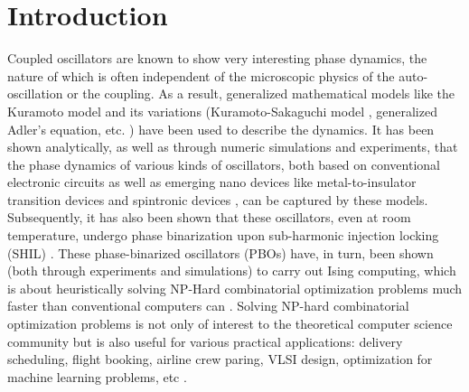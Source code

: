 \documentclass[%
 reprint,
 amsmath,amssymb,
 aps,
]{revtex4-2}
\begin{document}
\maketitle


\section{Introduction}

Coupled oscillators are known to show very interesting phase dynamics, the nature of which is often independent of the microscopic physics of the auto-oscillation or the coupling. As a result, generalized mathematical models like the Kuramoto model \citep{Kuramoto} and its variations (Kuramoto-Sakaguchi model \citep{Circuit5,Circuit6}, generalized Adler's equation, etc. \citep{Jaijeet1,Jaijeet2}) have been used to describe the dynamics. It has been shown analytically, as well as through numeric simulations and experiments, that the phase dynamics of various kinds of oscillators, both based on conventional electronic circuits \citep{Circuit5,Circuit6} as well as emerging nano devices like metal-to-insulator transition devices \citep{MIT1,MIT2} and spintronic devices \citep{Spin_Liu,Spin_DB1,Spin_DB2,Spin_Ashwin,Spin_Hyunsoo,Spin_Jullie2,Spin_Finocchio1,Spin_Finocchio2}, can be captured by these models. Subsequently, it has also been shown that these oscillators, even at room temperature, undergo phase binarization upon sub-harmonic injection locking (SHIL) \citep{Jaijeet1,Jaijeet2,Spin_Akerman1,Spin_Akerman3}. These phase-binarized oscillators (PBOs) have, in turn, been shown (both through experiments and simulations) to carry out Ising computing, which is about heuristically solving NP-Hard combinatorial optimization problems much faster than conventional computers can \citep{IsingComputingReview,Jaijeet2,Circuit1,Circuit2,Circuit3,Circuit4,Spin_Finocchio2,Spin_Akerman3}. Solving NP-hard combinatorial optimization problems is not only of interest to the theoretical computer science community but is also useful for various practical applications: delivery scheduling, flight booking, airline crew paring, VLSI design, optimization for machine learning problems, etc \citep{TOC, CombApp1, CombApp2}. 
\end{document}
